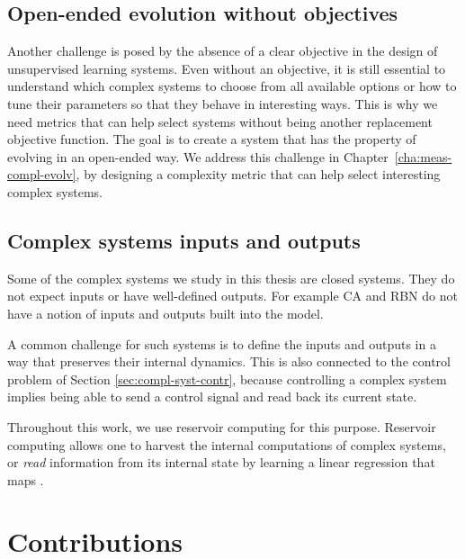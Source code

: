 \subsection{Open-ended evolution without
  objectives}\label{sec:open-ended-evolution}

Another challenge is posed by the absence of a clear objective in the design of
unsupervised learning systems. Even without an objective, it is still essential
to understand which complex systems to choose from all available options or how
to tune their parameters so that they behave in interesting ways. This is why we
need metrics that can help select systems without being another replacement
objective function. The goal is to create a system that has the property of
evolving in an open-ended way. We address this challenge in
Chapter~\ref{cha:meas-compl-evolv}, by designing a complexity metric that can
help select interesting complex systems.

\subsection{Complex systems inputs and outputs}

Some of the complex systems we study in this thesis are closed systems. They do
not expect inputs or have well-defined outputs. For example \ac{CA} and \ac{RBN}
do not have a notion of inputs and outputs built into the model.

A common challenge for such systems is to define the inputs and outputs in a way
that preserves their internal dynamics. This is also connected to the control
problem of Section \ref{sec:compl-syst-contr}, because controlling a complex
system implies being able to send a control signal and read back its current
state.

Throughout this work, we use reservoir computing for this purpose.
Reservoir computing allows one to harvest the internal computations of complex
systems, or \emph{read} information from its internal state by learning a linear
regression that maps .


\section{Contributions}

